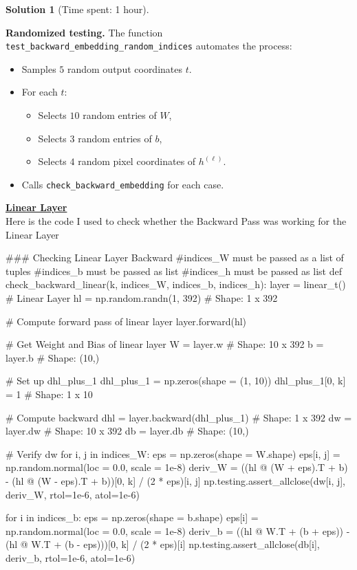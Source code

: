 \documentclass[11pt, reqno, letterpaper, twoside]{amsart}
\theoremstyle{plain}
\theoremstyle{definition}
\newtheorem{solution}[theorem]{Solution}
\begin{document}
\begin{solution}[Time spent: 1 hour]
\begin{enumerate}
\textbf{Randomized testing.}
The function \verb|test_backward_embedding_random_indices| automates the process:
\begin{itemize}
  \item Samples $5$ random output coordinates $t$.
  \item For each $t$:
    \begin{itemize}
      \item Selects $10$ random entries of $W$,
      \item Selects $3$ random entries of $b$,
      \item Selects $4$ random pixel coordinates of $h^{(\ell)}$.
    \end{itemize}
  \item Calls \verb|check_backward_embedding| for each case. \\
\end{itemize}



\textbf{\underline{Linear Layer}} \\
Here is the code I used to check whether the Backward Pass was working for the Linear Layer
\begin{python}
    ### Checking Linear Layer Backward
#indices_W must be passed as a list of tuples
#indices_b must be passed as list
#indices_h must be passed as list
def check_backward_linear(k, indices_W, indices_b, indices_h):
    layer = linear_t() # Linear Layer
    hl = np.random.randn(1, 392) # Shape: 1 x 392

    # Compute forward pass of linear layer
    layer.forward(hl)

    # Get Weight and Bias of linear layer
    W = layer.w # Shape: 10 x 392
    b = layer.b # Shape: (10,)

    # Set up dhl_plus_1
    dhl_plus_1 = np.zeros(shape = (1, 10))
    dhl_plus_1[0, k] = 1 # Shape: 1 x 10

    # Compute backward
    dhl = layer.backward(dhl_plus_1) # Shape: 1 x 392
    dw = layer.dw # Shape: 10 x 392
    db = layer.db # Shape: (10,)

    # Verify dw
    for i, j in indices_W:
        eps = np.zeros(shape = W.shape)
        eps[i, j] = np.random.normal(loc = 0.0, scale = 1e-8)
        deriv_W = ((hl @ (W + eps).T + b) - (hl @ (W - eps).T + b))[0, k] / (2 * eps)[i, j]
        np.testing.assert_allclose(dw[i, j], deriv_W, rtol=1e-6, atol=1e-6)
    
    for i in indices_b:
        eps = np.zeros(shape = b.shape)
        eps[i] = np.random.normal(loc = 0.0, scale = 1e-8)
        deriv_b = ((hl @ W.T + (b + eps)) - (hl @ W.T + (b - eps)))[0, k] / (2 * eps)[i]
        np.testing.assert_allclose(db[i], deriv_b, rtol=1e-6, atol=1e-6)
    

\end{python}
\end{enumerate}
\end{solution}
\end{document}
